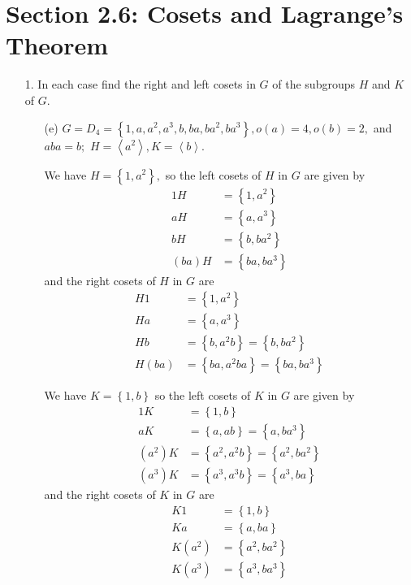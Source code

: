 \documentclass{article}
\begin{document}
\section*{Section 2.6: Cosets and Lagrange's Theorem}
\begin{itemize}
	\item[1.] In each case find the right and left cosets in $G$ of the subgroups $H$ and $K$ of $G.$ 
		\begin{itemize}
			\item[(e)] $G=D_4=\left\{ 1, a, a^2, a^3, b, ba, ba^2, ba^3 \right\}, o(a)=4, o(b)=2,$ and $aba=b;$ $H=\left< a^2\right>, K=\left< b\right>.$
				\begin{soln}
					We have $H=\left\{ 1, a^2 \right\},$ so the left cosets of $H$ in $G$ are given by
					\begin{align*}
						1H &= \left\{ 1, a^2 \right\} \\
						aH &= \left\{ a, a^3 \right\} \\
						bH &= \left\{ b, ba^2 \right\} \\
						(ba)H &= \left\{ ba, ba^3 \right\}
					\end{align*} and the right cosets of $H$ in $G$ are 
					\begin{align*}
						H1 &= \left\{ 1, a^2 \right\} \\
						Ha &= \left\{ a, a^3 \right\} \\
						Hb &= \left\{ b, a^2b \right\} = \left\{ b, ba^2 \right\} \\
						H(ba) &= \left\{ ba, a^2ba \right\} = \left\{ ba, ba^3 \right\}
					\end{align*}

					We have $K=\left\{ 1, b \right\}$ so the left cosets of $K$ in $G$ are given by
					\begin{align*}
						1K &= \left\{ 1, b \right\} \\
						aK &= \left\{ a, ab \right\} = \left\{ a, ba^3 \right\} \\
						(a^2)K &= \left\{ a^2, a^2b \right\} = \left\{ a^2, ba^2 \right\} \\
						(a^3)K &= \left\{ a^3, a^3b \right\} = \left\{ a^3, ba \right\}
					\end{align*} and the right cosets of $K$ in $G$ are 
					\begin{align*}
						K1 &= \left\{ 1, b \right\} \\
						Ka &= \left\{ a, ba \right\} \\
						K(a^2) &= \left\{ a^2, ba^2 \right\} \\
						K(a^3) &= \left\{ a^3, ba^3 \right\}
					\end{align*}
				\end{soln}


\end{itemize}
\end{itemize}
\end{document}
